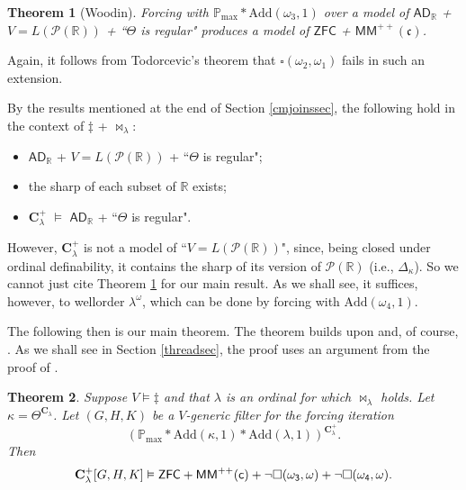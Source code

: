 \documentclass[12pt]{article}
\newtheorem{theorem}{Theorem}[section]
\def\c{{\mathbf{C}}}
\def\bbC{{\mathbf{C}}}
\newcommand{\ZFC}{\mathsf{ZFC}}
\renewcommand{\models}{\vDash}
\def\k{\kappa}
\def\a{\alpha}
\def\l{\lambda}
\newcommand{\ADR}{\mathsf{AD}_{\mathbb{R}}}
\newcommand{\Add}{\mathrm{Add}}
\newcommand{\pmax}{\mathbb{P}_{\mathrm{max}}}
\newcommand{\bbR}{\mathbb{R}}
\newcommand{\cP}{\mathcal{P}}
\newcommand{\MM}{\mathsf{MM}}
\begin{document}
\begin{theorem}[Woodin]\label{wsthrm} Forcing with $\pmax * \Add(\omega_{3}, 1)$ over a model of $\ADR$ +  $V = L(\cP(\bbR))$ + ``$\Theta$ is regular" produces a model of $\ZFC$ + $\MM^{++}(\mathfrak{c})$.
\end{theorem}

Again, it follows from Todorcevic's theorem that $\square(\omega_{2}, \omega_{1})$ fails in such an extension.

By the results mentioned at the end of Section \ref{cmjoinssec}, the following hold in the context of $\ddagger$ + $\Join_{\lambda}$:
\begin{itemize}
\item $\ADR$ +  $V = L(\cP(\bbR))$ + ``$\Theta$ is regular";
\item the sharp of each subset of $\bbR$ exists;
\item $\bbC^{+}_{\lambda}$ $\models$ $\ADR$ + ``$\Theta$ is regular".
\end{itemize} 
However, $\bbC^{+}_{\lambda}$ is not a model of ``$V =L(\cP(\bbR))$", since, being closed under ordinal definability, it contains the sharp of its version of $\cP(\bbR)$ (i.e., $\Delta_{\kappa}$).
So we cannot just cite Theorem \ref{wsthrm} for our main result. As we shall see, it suffices, however, to wellorder $\lambda^{\omega}$, which can be done by forcing with $\Add(\omega_{4}, 1)$.




The following then is our main theorem.
The theorem builds upon \cite{SquarePaper} and, of course, \cite{Woodin}. As we shall see in Section \ref{threadsec}, the proof uses an argument from the proof of \cite[Theorem 7.3]{SquarePaper}.

\begin{theorem}\label{mainthrm}
Suppose $V\models \ddagger$ and that $\lambda$ is an ordinal for which $\Join_{\lambda}$ holds. Let $\kappa = \Theta^{\c_{\lambda}}$.
Let $(G, H, K)$ be a $V$-generic filter for the forcing iteration
\[(\pmax*\Add(\k, 1)*\Add(\l, 1))^{\c^{+}_{\l}}.\]
Then
\[\c^+_{\l}[G, H, K]\models \ZFC + \sf{MM}^{++}(c)+\neg\square(\omega_3, \omega)+\neg\square(\omega_{4}, \omega).\]
\end{theorem}
\end{document}
